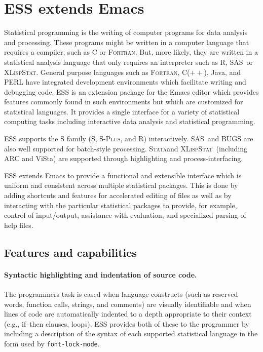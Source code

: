 \documentclass{article}
\newcommand*{\SAS}{\textsc{SAS}}
\newcommand*{\Splus}{\textsc{S-Plus}}
\newcommand*{\XLispStat}{\textsc{XLispStat}}
\newcommand*{\Stata}{\textsc{Stata}}
\newcommand*{\Fortran}{\textsc{Fortran}}
\newcommand{\stexttt}[1]{{\small\texttt{#1}}}
\begin{document}
\section{ESS extends Emacs}
\label{sec:ess-extends-emacs}

Statistical programming is the writing of computer programs for data
analysis and processing.  These programs might be written in a
computer language that requires a compiler, such as C or \Fortran.
But, more likely, they are written in a statistical analysis language
that only requires an interpreter such as R, \SAS\ or \XLispStat.
General purpose languages such as \Fortran, C($++$), Java, and PERL
have integrated development environments which facilitate writing and
debugging code.  ESS is an extension package for the Emacs editor
which provides features commonly found in such environments but which
are customized for statistical languages.  It provides a single
interface for a variety of statistical computing tasks including
interactive data analysis and statistical programming.

ESS supports the S family (S, \Splus, and R) interactively.  \SAS\ and
BUGS are also well supported for batch-style processing.  \Stata and
\XLispStat\ (including ARC and ViSta) are supported through
highlighting and process-interfacing.

ESS extends Emacs to provide a functional and extensible interface
which is uniform and consistent across multiple statistical packages.
This is done by adding shortcuts and features for accelerated editing
of files as well as by interacting with the particular statistical
packages to provide, for example, control of input/output, assistance
with evaluation, and specialized parsing of help files.

\subsection{Features and capabilities}
\label{sec:ESS:features}

\paragraph{Syntactic highlighting and indentation of source code.}
The programmers task is eased when language constructs (such as
reserved words, function calls, strings, and comments) are visually
identifiable and when lines of code are automatically indented to a
depth appropriate to their context (e.g., if--then clauses, loops).
ESS provides both of these to the programmer by including a
description of the syntax of each supported statistical language in
the form used by \stexttt{font-lock-mode}.
\end{document}

